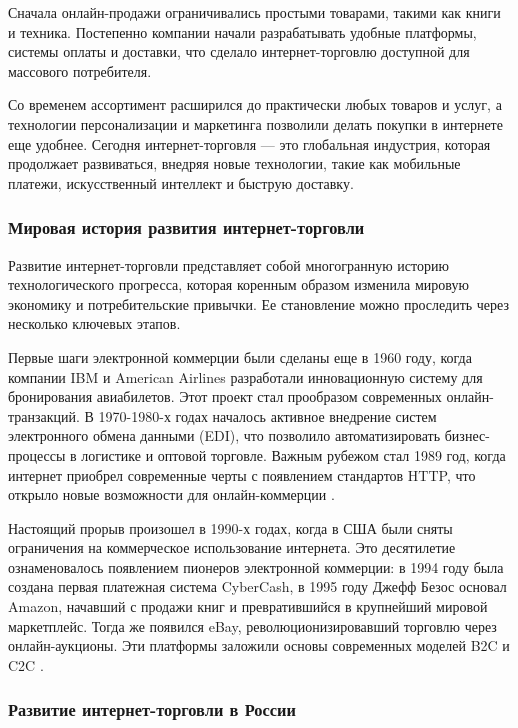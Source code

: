 Сначала онлайн-продажи ограничивались простыми товарами, такими как книги и техника. Постепенно компании начали разрабатывать удобные платформы, системы оплаты и доставки, что сделало интернет-торговлю доступной для массового потребителя.

Со временем ассортимент расширился до практически любых товаров и услуг, а технологии персонализации и маркетинга позволили делать покупки в интернете еще удобнее. Сегодня интернет-торговля — это глобальная индустрия, которая продолжает развиваться, внедряя новые технологии, такие как мобильные платежи, искусственный интеллект и быструю доставку.

\subsubsection{Мировая история развития интернет-торговли}

Развитие интернет-торговли представляет собой многогранную историю технологического прогресса, которая коренным образом изменила мировую экономику и потребительские привычки. Ее становление можно проследить через несколько ключевых этапов.

Первые шаги электронной коммерции были сделаны еще в 1960 году, когда компании IBM и American Airlines разработали инновационную систему для бронирования авиабилетов. Этот проект стал прообразом современных онлайн-транзакций. В 1970-1980-х годах началось активное внедрение систем электронного обмена данными (EDI), что позволило автоматизировать бизнес-процессы в логистике и оптовой торговле. Важным рубежом стал 1989 год, когда интернет приобрел современные черты с появлением стандартов HTTP, что открыло новые возможности для онлайн-коммерции  \cite{9}.

Настоящий прорыв произошел в 1990-х годах, когда в США были сняты ограничения на коммерческое использование интернета. Это десятилетие ознаменовалось появлением пионеров электронной коммерции: в 1994 году была создана первая платежная система CyberCash, в 1995 году Джефф Безос основал Amazon, начавший с продажи книг и превратившийся в крупнейший мировой маркетплейс. Тогда же появился eBay, революционизировавший торговлю через онлайн-аукционы. Эти платформы заложили основы современных моделей B2C и C2C \cite{9}.

\subsubsection{Развитие интернет-торговли в России}

